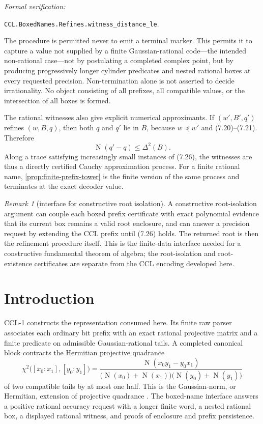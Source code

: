 \documentclass[10pt]{article}
\theoremstyle{definition}
\theoremstyle{remark}
\newtheorem{remark}[theorem]{Remark}
\newcommand{\Norm}{\operatorname{N}}
\newcommand{\pref}{\preccurlyeq}
\newcommand{\leanref}[1]{\par\smallskip\noindent
  \emph{Formal verification:}\par\nobreak
  {\raggedright\nolinkurl{#1}.\par}}
\newcommand{\Proj}[2]{[#1:#2]}
\begin{document}
\leanref{CCL.BoxedNames.Refines.witness_distance_le}

The procedure is permitted never to emit a terminal marker.  This permits it to capture a value not supplied by a finite Gaussian-rational code---the intended non-rational case---not by postulating a completed complex point, but by producing progressively longer cylinder predicates and nested rational boxes at every requested precision.  Non-termination alone is not asserted to decide irrationality.  No object consisting of all prefixes, all compatible values, or the intersection of all boxes is formed.

The rational witnesses also give explicit numerical approximants.  If $(w',B',q')$ refines $(w,B,q)$, then both $q$ and $q'$ lie in $B$, because $w\pref w'$ and (7.20)--(7.21).  Therefore
\[
 \Norm(q'-q)\le\Delta^2(B).
\tag{7.27}
\]
Along a trace satisfying increasingly small instances of (7.26), the witnesses are thus a directly certified Cauchy approximation process.  For a finite rational name, \autoref{prop:finite-prefix-tower} is the finite version of the same process and terminates at the exact decoder value.

\begin{remark}[interface for constructive root isolation]
A constructive root-isolation argument can couple each boxed prefix certificate with exact polynomial evidence that its current box remains a valid root enclosure, and can answer a precision request by extending the CCL prefix until (7.26) holds.  The returned root is then the refinement procedure itself.  This is the finite-data interface needed for a constructive fundamental theorem of algebra; the root-isolation and root-existence certificates are separate from the CCL encoding developed here.
\end{remark}

\fi

\ifCCLtwo
\section*{Introduction}

CCL-1 constructs the representation consumed here.  Its finite raw parser
associates each ordinary bit prefix with an exact rational projective matrix
and a finite predicate on admissible Gaussian-rational tails.  A completed
canonical block contracts the Hermitian projective quadrance
\[
 \chi^2\bigl(\Proj{x_0}{x_1},\Proj{y_0}{y_1}\bigr)
 =\frac{\Norm(x_0y_1-y_0x_1)}
 {\bigl(\Norm(x_0)+\Norm(x_1)\bigr)
  \bigl(\Norm(y_0)+\Norm(y_1)\bigr)}
\]
of two compatible tails by at most one half.  This is the Gaussian-norm, or
Hermitian, extension of projective quadrance \cite{wildberger-projective}.
The boxed-name interface answers a positive
rational accuracy request with a longer finite word, a nested rational box,
a displayed rational witness, and proofs of enclosure and prefix
persistence.
\end{document}
